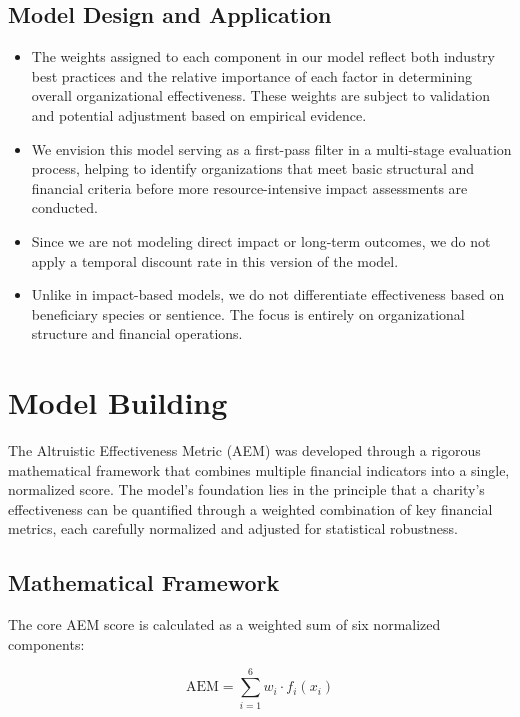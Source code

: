 \documentclass[12pt]{article}
\begin{document}
\subsection*{Model Design and Application}
\begin{itemize}
    \item The weights assigned to each component in our model reflect both industry best practices and the relative importance of each factor in determining overall organizational effectiveness. These weights are subject to validation and potential adjustment based on empirical evidence.
    
    \item We envision this model serving as a first-pass filter in a multi-stage evaluation process, helping to identify organizations that meet basic structural and financial criteria before more resource-intensive impact assessments are conducted.
    
    \item Since we are not modeling direct impact or long-term outcomes, we do not apply a temporal discount rate in this version of the model.
    
    \item Unlike in impact-based models, we do not differentiate effectiveness based on beneficiary species or sentience. The focus is entirely on organizational structure and financial operations.
\end{itemize}

\section{Model Building}

The Altruistic Effectiveness Metric (AEM) was developed through a rigorous mathematical framework that combines multiple financial indicators into a single, normalized score. The model's foundation lies in the principle that a charity's effectiveness can be quantified through a weighted combination of key financial metrics, each carefully normalized and adjusted for statistical robustness.

\subsection{Mathematical Framework}

The core AEM score is calculated as a weighted sum of six normalized components:

\begin{equation}
    \text{AEM} = \sum_{i=1}^{6} w_i \cdot f_i(x_i)
\end{equation}
\end{document}

